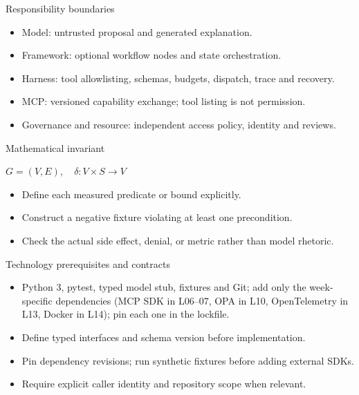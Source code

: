 \documentclass[aspectratio=169,10pt]{beamer}
\begin{document}
\begin{frame}{Responsibility boundaries}
\small
\begin{itemize}
\item Model: untrusted proposal and generated explanation.
\item Framework: optional workflow nodes and state orchestration.
\item Harness: tool allowlisting, schemas, budgets, dispatch, trace and recovery.
\item MCP: versioned capability exchange; tool listing is not permission.
\item Governance and resource: independent access policy, identity and reviews.
\end{itemize}

\end{frame}

\begin{frame}{Mathematical invariant}
\small
\begin{center}\Large $G=(V,E),\quad\delta:V\times S\rightarrow V$\end{center}
\begin{itemize}
\item Define each measured predicate or bound explicitly.
\item Construct a negative fixture violating at least one precondition.
\item Check the actual side effect, denial, or metric rather than model rhetoric.
\end{itemize}

\end{frame}

\begin{frame}{Technology prerequisites and contracts}
\small
\begin{itemize}
\item Python 3, pytest, typed model stub, fixtures and Git; add only the week-specific dependencies (MCP SDK in L06--07, OPA in L10, OpenTelemetry in L13, Docker in L14); pin each one in the lockfile.
\item Define typed interfaces and schema version before implementation.
\item Pin dependency revisions; run synthetic fixtures before adding external SDKs.
\item Require explicit caller identity and repository scope when relevant.
\end{itemize}

\end{frame}
\end{document}
